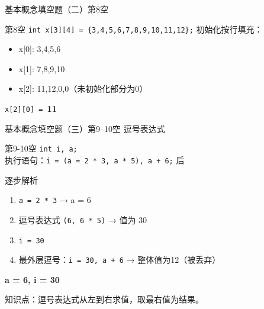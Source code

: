 \begin{frame}{基本概念填空题（二）}{第8空}
    \begin{exampleblock}{第8空}
        \small \texttt{int x[3][4] = \{3,4,5,6,7,8,9,10,11,12\};}
        初始化按行填充：
        \begin{itemize}
            \setlength{\itemsep}{0pt}
            \item x[0]: {3,4,5,6}
            \item x[1]: {7,8,9,10}
            \item x[2]: {11,12,0,0}（未初始化部分为0）
        \end{itemize}
        \texttt{x[2][0] = }\textbf{11}
    \end{exampleblock}
\end{frame}

\begin{frame}{基本概念填空题（三）}{第9--10空 逗号表达式}
    \begin{exampleblock}{第9-10空}
        \small \texttt{int i, a;} \\
        执行语句：\texttt{i = (a = 2 * 3, a * 5), a + 6;} 后
    \end{exampleblock}
    \pause
    \begin{alertblock}{逐步解析}
        \footnotesize
        \begin{enumerate}
            \setlength{\itemsep}{0pt}
            \item \texttt{a = 2 * 3} → a = 6
            \item 逗号表达式 \texttt{(6, 6 * 5)} → 值为 30
            \item \texttt{i = 30}
            \item 最外层逗号：\texttt{i = 30, a + 6} → 整体值为12（被丢弃）
        \end{enumerate}
        \textbf{a = 6, i = 30}

        \vspace{0.3em}
        {\color{highlight}知识点：逗号表达式从左到右求值，取最右值为结果。}
    \end{alertblock}
\end{frame}
